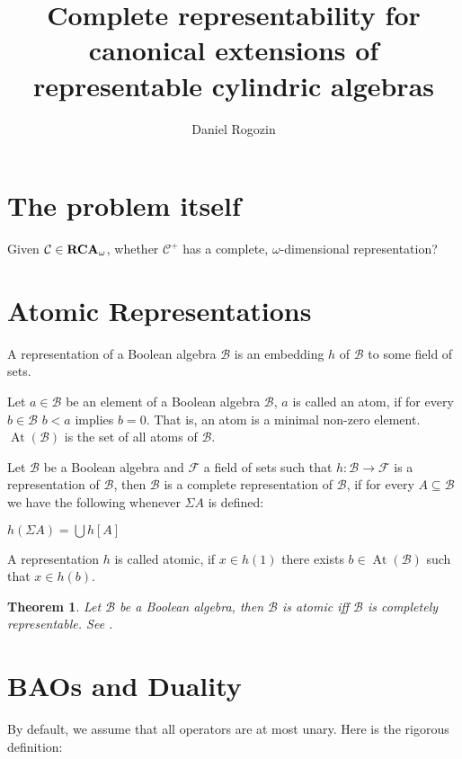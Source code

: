 \documentclass[a4paper]{article}
\author{Daniel Rogozin}
\date{}
\title{Complete representability for canonical extensions of representable cylindric algebras}
\theoremstyle{defin}
\theoremstyle{theorem}
\newtheorem{theorem}{Theorem}
\theoremstyle{prop}
\theoremstyle{lemma}
\theoremstyle{fact}
\theoremstyle{ex}
\theoremstyle{col}
\begin{document}
\maketitle

\section{The problem itself}

Given $\mathcal{C} \in {\bf RCA}_{\omega}$, whether $\mathcal{C}^{+}$ has a complete, $\omega$-dimensional representation? \cite{hirsch2002relation}

\section{Atomic Representations}

A representation of a Boolean algebra $\mathcal{B}$ is an embedding $h$ of $\mathcal{B}$ to some field of sets.

Let $a \in \mathcal{B}$ be an element of a Boolean algebra $\mathcal{B}$, $a$ is called an atom, if for every $b \in \mathcal{B}$
$b < a$ implies $b = 0$. That is, an atom is a minimal non-zero element. $\operatorname{At}(\mathcal{B})$ is the set of all atoms
of $\mathcal{B}$.

Let $\mathcal{B}$ be a Boolean algebra and $\mathcal{F}$ a field of sets such that $h : \mathcal{B} \to \mathcal{F}$ is a
representation of $\mathcal{B}$, then $\mathcal{B}$ is a complete representation of $\mathcal{B}$, if for every
$A \subseteq \mathcal{B}$ we have the following whenever $\Sigma A$ is defined:
\begin{center}
  $h(\Sigma A) = \bigcup h[A]$
\end{center}

A representation $h$ is called atomic, if $x \in h(1)$ there exists $b \in \operatorname{At}(\mathcal{B})$ such that $x \in h(b)$.

\begin{theorem} \label{completeboolean}
  Let $\mathcal{B}$ be a Boolean algebra, then $\mathcal{B}$ is atomic iff $\mathcal{B}$ is completely representable. See \cite[Corollary 6]{hirsch1997complete}.
\end{theorem}

\section{BAOs and Duality}

By default, we assume that all operators are at most unary. Here is the rigorous definition:
\end{document}
